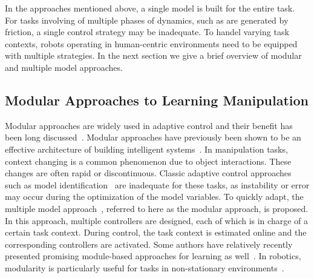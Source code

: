 
In the approaches mentioned above, a single model is built for the
entire task. For tasks involving of multiple phases of dynamics, such
as are generated by friction, a single control strategy may be inadequate. To handel
varying task contexts, robots operating in human-centric environments
need to be equipped with multiple strategies. In the next section we
give a brief overview of  modular and multiple model approaches.


\subsection{Modular Approaches to Learning Manipulation}


Modular approaches are widely used in adaptive control and their
benefit has been long
discussed~\citep{jacobs1991adaptive,narendra1997adaptive,BrysonIJCAI01}.
Modular approaches have previously been shown to be an effective
architecture of building intelligent
systems~\citep{mobile98,BrysonJETAI00}.  In manipulation tasks,
context changing is a common phenomenon due to object
interactions. These changes are often rapid or discontinuous. Classic
adaptive control approaches such as model
identification~\citep{khalil2004modeling} are inadequate for these
tasks, as instability or error may occur during the optimization of
the model variables. To quickly adapt, the multiple model
approach~\citep{narendra1995adaptation}, referred to here as the
modular approach, is proposed. In this approach, multiple controllers
are designed, each of which is in charge of a certain task
context. During control, the task context is estimated online and the
corresponding controllers are activated. Some authors have relatively
recently presented promising module-based approaches for learning as
well~\citep{fekri2007robust,kuipers2010multiple}.  In robotics,
modularity is particularly useful for tasks in non-stationary
environments~\citep{sugimoto2012emosaic}.

